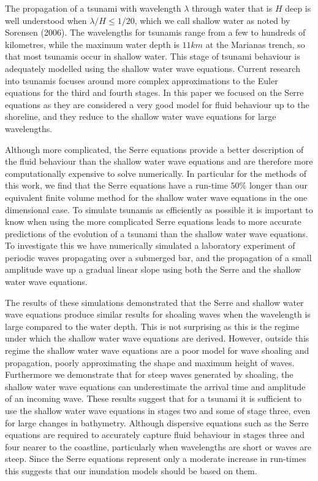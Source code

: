 The propagation of a tsunami with wavelength $\lambda$ through water that is $H$ deep is well understood when $\lambda / H \le 1/ 20$, which we call shallow water as noted by Sorensen (2006). The wavelengths for tsunamis range from a few to hundreds of kilometres, while the maximum water depth is $11km$ at the Marianas trench, so that most tsunamis occur in shallow water. This stage of tsunami behaviour is adequately modelled using the shallow water wave equations. Current research into tsunamis focuses around more complex approximations to the Euler equations for the third and fourth stages. In this paper we focused on the Serre equations as they are considered a very good model for fluid behaviour up to the shoreline, and they reduce to the shallow water wave equations for large wavelengths. 

Although more complicated, the Serre equations provide a better description of the fluid behaviour than the shallow water wave equations and are therefore more computationally expensive to solve numerically. In particular for the methods of this work, we find that the Serre equations have a run-time $50\%$ longer than our equivalent finite volume method for the shallow water wave equations in the one dimensional case. To simulate tsunamis as efficiently as possible it is important to know when using the more complicated Serre equations leads to more accurate predictions of the evolution of a tsunami than the shallow water wave equations. To investigate this we have numerically simulated a laboratory experiment of periodic waves propagating over a submerged bar, and the propagation of a small amplitude wave up a gradual linear slope using both the Serre and the shallow water wave equations.

The results of these simulations demonstrated that the Serre and shallow water wave equations produce similar results for shoaling waves when the wavelength is large compared to the water depth. This is not surprising as this is the regime under which the shallow water wave equations are derived. However, outside this regime the shallow water wave equations are a poor model for wave shoaling and propagation, poorly approximating the shape and maximum height of waves. Furthermore we demonstrate that for steep waves generated by shoaling, the shallow water wave equations can underestimate the arrival time and amplitude of an incoming wave. These results suggest that for a tsunami it is sufficient to use the shallow water wave equations in stages two and some of stage three, even for large changes in bathymetry. Although dispersive equations such as the Serre equations are required to accurately capture fluid behaviour in stages three and four nearer to the coastline, particularly when wavelengths are short or waves are steep. Since the Serre equations represent only a moderate increase in run-times this suggests that our inundation models should be based on them.

